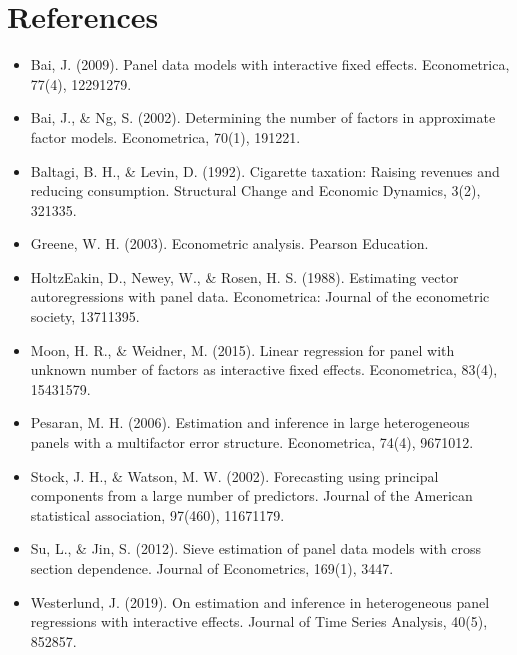 \documentclass[a4paper,11pt,english]{sphinxmanual}
\begin{document}
\chapter{References}
\label{\detokenize{references:references}}\label{\detokenize{references:id1}}\label{\detokenize{references::doc}}\begin{itemize}
\item {} 
\sphinxAtStartPar
Bai, J. (2009). Panel data models with interactive fixed effects. Econometrica, 77(4), 1229\sphinxhyphen{}1279.

\item {} 
\sphinxAtStartPar
Bai, J., \& Ng, S. (2002). Determining the number of factors in approximate factor models. Econometrica, 70(1), 191\sphinxhyphen{}221.

\item {} 
\sphinxAtStartPar
Baltagi, B. H., \& Levin, D. (1992). Cigarette taxation: Raising revenues and reducing consumption. Structural Change and Economic Dynamics, 3(2), 321\sphinxhyphen{}335.

\item {} 
\sphinxAtStartPar
Greene, W. H. (2003). Econometric analysis. Pearson Education.

\item {} 
\sphinxAtStartPar
Holtz\sphinxhyphen{}Eakin, D., Newey, W., \& Rosen, H. S. (1988). Estimating vector autoregressions with panel data. Econometrica: Journal of the econometric society, 1371\sphinxhyphen{}1395.

\item {} 
\sphinxAtStartPar
Moon, H. R., \& Weidner, M. (2015). Linear regression for panel with unknown number of factors as interactive fixed effects. Econometrica, 83(4), 1543\sphinxhyphen{}1579.

\item {} 
\sphinxAtStartPar
Pesaran, M. H. (2006). Estimation and inference in large heterogeneous panels with a multifactor error structure. Econometrica, 74(4), 967\sphinxhyphen{}1012.

\item {} 
\sphinxAtStartPar
Stock, J. H., \& Watson, M. W. (2002). Forecasting using principal components from a large number of predictors. Journal of the American statistical association, 97(460), 1167\sphinxhyphen{}1179.

\item {} 
\sphinxAtStartPar
Su, L., \& Jin, S. (2012). Sieve estimation of panel data models with cross section dependence. Journal of Econometrics, 169(1), 34\sphinxhyphen{}47.

\item {} 
\sphinxAtStartPar
Westerlund, J. (2019). On estimation and inference in heterogeneous panel regressions with interactive effects. Journal of Time Series Analysis, 40(5), 852\sphinxhyphen{}857.

\end{itemize}
\end{document}
